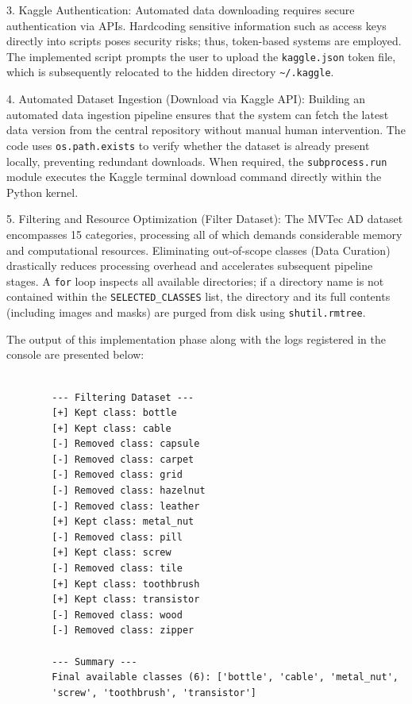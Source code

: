 \documentclass{article}
\begin{document}
\vspace{0.3cm}
3. Kaggle Authentication:
Automated data downloading requires secure authentication via APIs. Hardcoding sensitive information such as access keys directly into scripts poses security risks; thus, token-based systems are employed. The implemented script prompts the user to upload the \texttt{kaggle.json} token file, which is subsequently relocated to the hidden directory \texttt{\textasciitilde/.kaggle}.

\vspace{0.3cm}
4. Automated Dataset Ingestion (Download via Kaggle API):
Building an automated data ingestion pipeline ensures that the system can fetch the latest data version from the central repository without manual human intervention. The code uses \texttt{os.path.exists} to verify whether the dataset is already present locally, preventing redundant downloads. When required, the \texttt{subprocess.run} module executes the Kaggle terminal download command directly within the Python kernel.

\vspace{0.3cm}
5. Filtering and Resource Optimization (Filter Dataset):
The MVTec AD dataset encompasses 15 categories, processing all of which demands considerable memory and computational resources. Eliminating out-of-scope classes (Data Curation) drastically reduces processing overhead and accelerates subsequent pipeline stages. A \texttt{for} loop inspects all available directories; if a directory name is not contained within the \texttt{SELECTED\_CLASSES} list, the directory and its full contents (including images and masks) are purged from disk using \texttt{shutil.rmtree}.

The output of this implementation phase along with the logs registered in the console are presented below:

\begin{tcolorbox}[colback=Tan!15, colframe=MidnightBlue, title=Execution Log Output for Dataset Filtering in Python]
		\begin{verbatim}
		
		--- Filtering Dataset ---
		[+] Kept class: bottle
		[+] Kept class: cable
		[-] Removed class: capsule
		[-] Removed class: carpet
		[-] Removed class: grid
		[-] Removed class: hazelnut
		[-] Removed class: leather
		[+] Kept class: metal_nut
		[-] Removed class: pill
		[+] Kept class: screw
		[-] Removed class: tile
		[+] Kept class: toothbrush
		[+] Kept class: transistor
		[-] Removed class: wood
		[-] Removed class: zipper
		
		--- Summary ---
		Final available classes (6): ['bottle', 'cable', 'metal_nut',
		'screw', 'toothbrush', 'transistor']
		\end{verbatim}
\end{tcolorbox}
\end{document}
